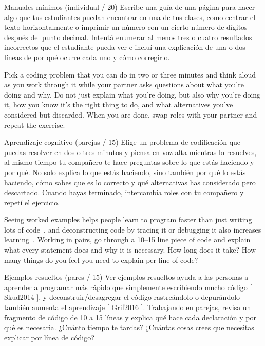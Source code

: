 {Manuales mínimos (individual / 20)
Escribe una guía de una página para hacer algo que tus estudiantes puedan encontrar en una de tus clases, como centrar el texto horizontalmente o imprimir un número con un cierto número de dígitos después del punto decimal. Intentá enumerar al menos tres o cuatro resultados incorrectos que el estudiante pueda ver e incluí una explicación de una o dos líneas de por qué ocurre cada uno y cómo corregirlo.



Pick a coding problem that you can do in two or three minutes
and think aloud as you work through it
while your partner asks questions about what you're doing and why.
Do not just explain what you're doing,
but also why you're doing it,
how you know it's the right thing to do,
and what alternatives you've considered but discarded.
When you are done,
swap roles with your partner and repeat the exercise.

Aprendizaje cognitivo (parejas / 15)
Elige un problema de codificación que puedas resolver en dos o tres minutos y piensa en voz alta mientras lo resuelves, al mismo tiempo tu compañero te hace preguntas sobre lo que estás haciendo y por qué. No solo explica lo que estás haciendo, sino también por qué lo estás haciendo, cómo sabes que es lo correcto y qué alternativas has considerado pero descartado. Cuando hayas terminado, intercambia roles con tu compañero y repetí el ejercicio.



Seeing worked examples helps people learn to program faster than just writing lots of code~\cite{Skud2014},
and deconstructing code by tracing it or debugging it also increases learning~\cite{Grif2016}.
Working in pairs,
go through a 10--15 line piece of code and explain what every statement does
and why it is necessary.
How long does it take?
How many things do you feel you need to explain per line of code?

Ejemplos resueltos (pares / 15)
Ver ejemplos resueltos ayuda a las personas a aprender a programar más rápido que simplemente escribiendo mucho código [ Skud2014 ], y deconstruir/desagregar el código rastreándolo o depurándolo también aumenta el aprendizaje [ Grif2016 ]. Trabajando en parejas, revisa un fragmento de código de 10 a 15 líneas y explica qué hace cada declaración y por qué es necesaria. ¿Cuánto tiempo te tardas? ¿Cuántas cosas crees que necesitas explicar por línea de código?

}
